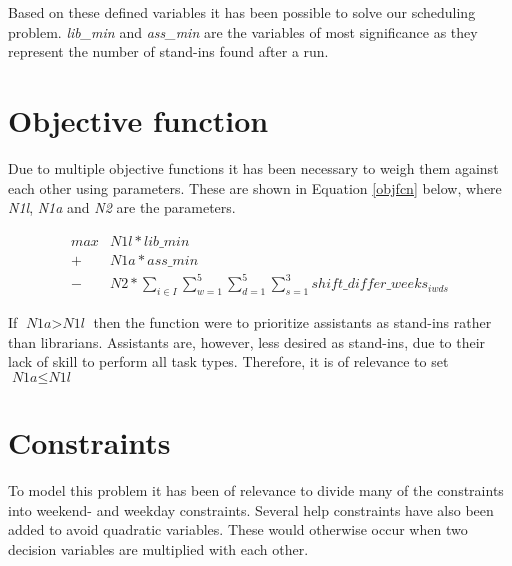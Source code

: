 
Based on these defined variables it has been possible to solve our scheduling problem. \textit{lib\_min} and \textit{ass\_min} are the variables of most significance as they represent the number of stand-ins found after a run. 

\section{Objective function}
Due to multiple objective functions it has been necessary to weigh them against each other using parameters. These are shown in Equation \ref{objfcn} below, where \textit{N1l}, \textit{N1a} and \textit{N2} are the parameters.

\begin{equation} \label{objfcn}
\begin{split}
max &N1l*lib\_min\\
 + &N1a*ass\_min \\
 - &N2*\sum_{i \in I}\sum_{w = 1}^{5}\sum_{d = 1}^{5}\sum_{s = 1}^{3} shift\_differ\_weeks_{iwds}
\end{split}
\end{equation}

If $\textit{N1a} > \textit{N1l}$ then the function were to prioritize assistants as stand-ins rather than librarians. Assistants are, however, less desired as stand-ins, due to their lack of skill to perform all task types. Therefore, it is of relevance to set $\textit{N1a} \leq \textit{N1l}$

\section{Constraints} \label{constraints}
To model this problem it has been of relevance to divide many of the constraints into weekend- and weekday constraints. Several help constraints have also been added to avoid quadratic variables. These would otherwise occur when two decision variables are multiplied with each other. 